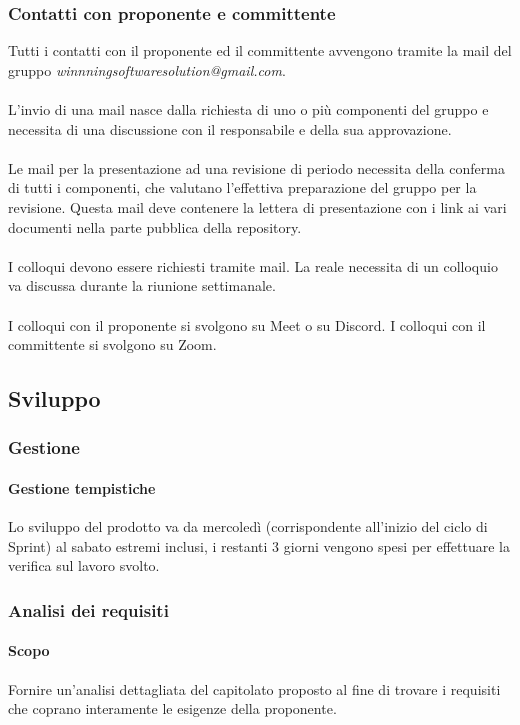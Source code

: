 \documentclass[a4paper, 12pt]{article}
\begin{document}
\subsubsection{Contatti con proponente e committente}

Tutti i contatti con il proponente ed il committente avvengono tramite la mail del gruppo \textit{winnningsoftwaresolution@gmail.com}.\\\\
L'invio di una mail nasce dalla richiesta di uno o più componenti del gruppo e necessita di una discussione con il responsabile e della sua approvazione.\\\\
Le mail per la presentazione ad una revisione di periodo necessita della conferma di tutti i componenti, che valutano l'effettiva preparazione del gruppo per la revisione. Questa mail deve contenere la lettera di presentazione con i link ai vari documenti nella parte pubblica della repository.\\\\
I colloqui devono essere richiesti tramite mail. La reale necessita di un colloquio va discussa durante la riunione settimanale.\\\\
I colloqui con il proponente si svolgono su Meet o su Discord. I colloqui con il committente si svolgono su Zoom.
\subsection{Sviluppo}\label{processi-primari-sviluppo}
\subsubsection{Gestione}
\paragraph{Gestione tempistiche}
Lo sviluppo del prodotto va da mercoledì (corrispondente all'inizio del ciclo di Sprint) al sabato estremi inclusi, i restanti 3 giorni vengono spesi per effettuare la verifica sul lavoro svolto. 
\subsubsection{Analisi dei requisiti}
\paragraph{Scopo}
Fornire un'analisi dettagliata del capitolato proposto al fine di trovare i requisiti che coprano interamente le esigenze della proponente.
\end{document}

